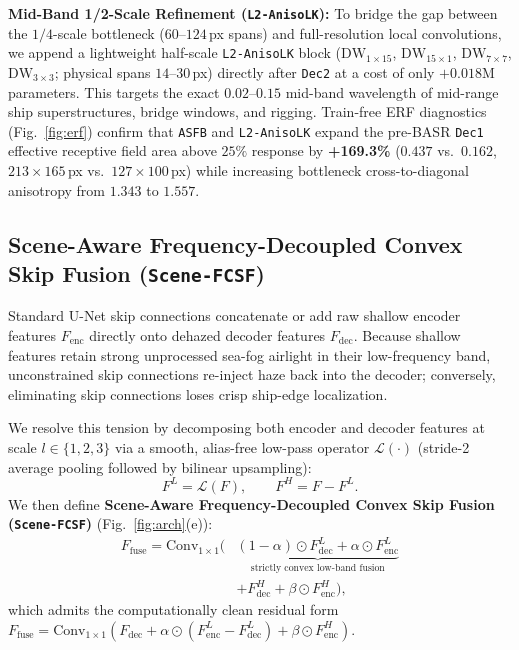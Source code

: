 \documentclass[journal,twoside]{IEEEtran}
\begin{document}
\textbf{Mid-Band 1/2-Scale Refinement (\texttt{L2-AnisoLK}):} To bridge the gap between the $1/4$-scale bottleneck ($60\text{--}124$\,px spans) and full-resolution local convolutions, we append a lightweight half-scale \texttt{L2-AnisoLK} block ($\mathrm{DW}_{1\times 15}$, $\mathrm{DW}_{15\times 1}$, $\mathrm{DW}_{7\times 7}$, $\mathrm{DW}_{3\times 3}$; physical spans $14\text{--}30$\,px) directly after \texttt{Dec2} at a cost of only $+0.018\text{M}$ parameters. This targets the exact $0.02\text{--}0.15$ mid-band wavelength of mid-range ship superstructures, bridge windows, and rigging. Train-free ERF diagnostics (Fig.~\ref{fig:erf}) confirm that \texttt{ASFB} and \texttt{L2-AnisoLK} expand the pre-BASR \texttt{Dec1} effective receptive field area above $25\%$ response by \textbf{+169.3\%} ($0.437$ vs.\ $0.162$, $213\times 165$\,px vs.\ $127\times 100$\,px) while increasing bottleneck cross-to-diagonal anisotropy from $1.343$ to $1.557$.

\subsection{Scene-Aware Frequency-Decoupled Convex Skip Fusion (\texorpdfstring{\texttt{Scene-FCSF}}{Scene-FCSF})}
\label{sec:fcsf}

Standard U-Net skip connections concatenate or add raw shallow encoder features $F_{\mathrm{enc}}$ directly onto dehazed decoder features $F_{\mathrm{dec}}$. Because shallow features retain strong unprocessed sea-fog airlight in their low-frequency band, unconstrained skip connections re-inject haze back into the decoder; conversely, eliminating skip connections loses crisp ship-edge localization.

We resolve this tension by decomposing both encoder and decoder features at scale $l\in\{1,2,3\}$ via a smooth, alias-free low-pass operator $\mathcal{L}(\cdot)$ (stride-2 average pooling followed by bilinear upsampling):
\begin{equation}
F^L = \mathcal{L}(F), \qquad F^H = F - F^L.
\label{eq:lp_split}
\end{equation}
We then define \textbf{Scene-Aware Frequency-Decoupled Convex Skip Fusion (\texttt{Scene-FCSF})} (Fig.~\ref{fig:arch}(e)):
\begin{equation}
\begin{aligned}
F_{\mathrm{fuse}} = \mathrm{Conv}_{1\times 1}\!\Big(&\underbrace{(1 - \alpha)\odot F_{\mathrm{dec}}^L + \alpha \odot F_{\mathrm{enc}}^L}_{\text{strictly convex low-band fusion}} \\
&+ F_{\mathrm{dec}}^H + \beta \odot F_{\mathrm{enc}}^H\Big),
\end{aligned}
\label{eq:fcsf}
\end{equation}
which admits the computationally clean residual form $F_{\mathrm{fuse}} = \mathrm{Conv}_{1\times 1}(F_{\mathrm{dec}} + \alpha\odot(F_{\mathrm{enc}}^L - F_{\mathrm{dec}}^L) + \beta\odot F_{\mathrm{enc}}^H)$.
\end{document}
